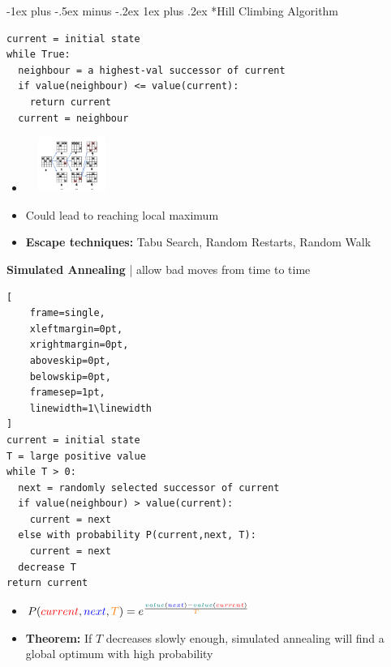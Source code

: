 \documentclass[10pt,landscape]{article}
\makeatletter
\newcommand{\subsubsubsection}{\@startsection{subsubsection}{3}{0mm}%
                                {-1ex plus -.5ex minus -.2ex}%
                                {1ex plus .2ex}%
                                {\normalfont\scriptsize\bfseries}}
\makeatother
\begin{document}
\begin{multicols*}{3}
\subsubsubsection*{Hill Climbing Algorithm}
\begin{multicols}{2}[\setlength{\columnsep}{-2.8cm}]
  \begin{lstlisting}
current = initial state
while True:
  neighbour = a highest-val successor of current
  if value(neighbour) <= value(current):
    return current
  current = neighbour
\end{lstlisting}
\begin{itemize}[topsep=0pt,noitemsep,left=64pt]
  \item[] \includegraphics*[width=3cm, height=1.8cm]{images/nqueens.PNG}
\end{itemize}
\end{multicols}
\begin{itemize}[topsep=0pt,noitemsep,wide=0pt, leftmargin=\dimexpr{} + 2\relax]
  \item Could lead to reaching local maximum
  \item \textbf{Escape techniques:} Tabu Search, Random Restarts, Random Walk
\end{itemize}

\textbf{Simulated Annealing} | allow bad moves from time to time
\begin{multicols}{2}[\setlength{\columnsep}{-2.4cm}]
  \begin{lstlisting}[
    frame=single,         
    xleftmargin=0pt,      
    xrightmargin=0pt,     
    aboveskip=0pt,        
    belowskip=0pt,       
    framesep=1pt,          
    linewidth=1\linewidth
]
current = initial state
T = large positive value
while T > 0:
  next = randomly selected successor of current
  if value(neighbour) > value(current):
    current = next
  else with probability P(current,next, T):
    current = next
  decrease T
return current
\end{lstlisting}
\begin{itemize}[topsep=0pt,noitemsep,left=64pt]
  \item $P(\textcolor{red}{current}, \textcolor{blue}{next}, \textcolor{orange}{T}) = e^{\frac{\textcolor{teal}{value}(\textcolor{blue}{next}) - \textcolor{teal}{value}(\textcolor{red}{current})}{\textcolor{orange}{T}}}$
  \item \textbf{Theorem:} If $T$ decreases slowly enough, simulated annealing will find a global optimum with high probability
\end{itemize}
\end{multicols}


\end{multicols*}
\end{document}
